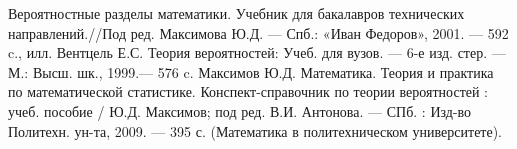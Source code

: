 
\begin{thebibliography}{}
     Вероятностные разделы математики. Учебник для бакалавров технических направлений.//Под ред. Максимова Ю.Д. — Спб.: «Иван Федоров», 2001. — 592 c., илл.
      Вентцель Е.С. Теория вероятностей: Учеб. для вузов. — 6-е изд. стер. — М.: Высш. шк., 1999.— 576 c.
      Максимов Ю.Д. Математика. Теория и практика по математической статистике. Конспект-справочник по теории вероятностей : учеб. пособие / Ю.Д. Максимов; под ред. В.И. Антонова. — СПб. : Изд-во Политехн. ун-та, 2009. — 395 с. (Математика в политехническом университете).
\end{thebibliography}